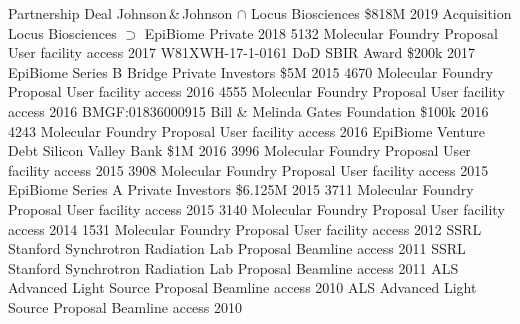 \begin{cvhonors}
  \cvhonor
    {Partnership Deal}
    {Johnson\,\&\,Johnson $\cap$ Locus Biosciences}
    {\$818M}
    {2019}
  \cvhonor
    {Acquisition}
    {Locus Biosciences $\supset$ EpiBiome}
    {Private}
    {2018}
  \cvhonor
    {5132}
    {Molecular Foundry Proposal}
    {User facility access}
    {2017}
  \cvhonor
    {W81XWH-17-1-0161}
    {DoD SBIR Award}
    {\$200k}
    {2017}
  \cvhonor
    {EpiBiome Series B Bridge}
    {Private Investors}
    {\$5M}
    {2015}
  \cvhonor
    {4670}
    {Molecular Foundry Proposal}
    {User facility access}
    {2016}
  \cvhonor
    {4555}
    {Molecular Foundry Proposal}
    {User facility access}
    {2016}
  \cvhonor
    {BMGF:01836000915}
    {Bill \& Melinda Gates Foundation}
    {\$100k}
    {2016}
  \cvhonor
    {4243}
    {Molecular Foundry Proposal}
    {User facility access}
    {2016}
  \cvhonor
    {EpiBiome Venture Debt}
    {Silicon Valley Bank}
    {\$1M}
    {2016}
  \cvhonor
    {3996}
    {Molecular Foundry Proposal}
    {User facility access}
    {2015}
  \cvhonor
    {3908}
    {Molecular Foundry Proposal}
    {User facility access}
    {2015}
  \cvhonor
    {EpiBiome Series A}
    {Private Investors}
    {\$6.125M}
    {2015}
  \cvhonor
    {3711}
    {Molecular Foundry Proposal}
    {User facility access}
    {2015}
  \cvhonor
    {3140}
    {Molecular Foundry Proposal}
    {User facility access}
    {2014}
  \cvhonor
    {1531}
    {Molecular Foundry Proposal}
    {User facility access}
    {2012}
  \cvhonor
    {SSRL}
    {Stanford Synchrotron Radiation Lab Proposal}
    {Beamline access}
    {2011}
  \cvhonor
    {SSRL}
    {Stanford Synchrotron Radiation Lab Proposal}
    {Beamline access}
    {2011}
  \cvhonor
    {ALS}
    {Advanced Light Source Proposal}
    {Beamline access}
    {2010}
  \cvhonor
    {ALS}
    {Advanced Light Source Proposal}
    {Beamline access}
    {2010}
\end{cvhonors}
